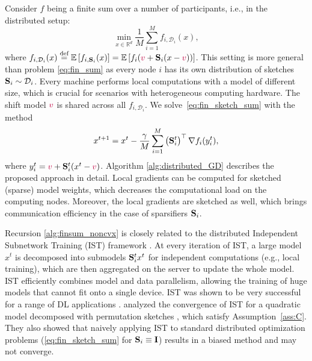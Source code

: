 \documentclass{article}
\newcommand{\shift}{{\color{purple}s}}
\newcommand{\bb}{\mathbb}
\newcommand{\R}{\bb R}
\newcommand{\cD}{\mathcal{D}}
\newcommand{\mI}{\mathbf{I}}
\newcommand{\eqdef}{\stackrel{\text{def}}{=}}
\newcommand{\Exp}[1]{{\bb E}\left[#1\right]}
\theoremstyle{plain}
\renewcommand{\shift}{{\color{purple}v}}
\newcommand{\mS}{{\bf S}}
\theoremstyle{plain}
\theoremstyle{definition}
\theoremstyle{remark}
\begin{document}
Consider $f$ being a finite sum over a number of participants, i.e., in the distributed setup:
\begin{equation} \label{eq:fin_sketch_sum}
	\min\limits_{x\in \R^d} \frac{1}{M}\sum\limits_{i=1}^M f_{i, \cD_i} (x),
\end{equation}
where $f_{i, \cD_i} (x) \eqdef \Exp{f_{i, \mS_i}(x)} = \Exp{f_i(\shift + \mS_i (x-\shift))}$.
This setting is more general than problem \eqref{eq:fin_sum} as every node $i$ has its own distribution of sketches $\mS_i \sim \cD_i$. Every machine performs local computations with a model of different size, which is crucial for scenarios with heterogeneous computing hardware.
The shift model $\shift$ is shared across all $f_{i, \mathcal{D}_i}$. We solve~\eqref{eq:fin_sketch_sum} with the method
\begin{equation} \label{alg:finsum_noncvx}
	x^{t+1} = x^t - \frac{\gamma}{M} \sum_{i=1}^{M}\left(\mS_i^t\right)^{\top} \nabla f_i(y^t_i),
\end{equation}
where $y^t_i = \shift + \mS_i^t (x^t - \shift)$.
Algorithm \ref{alg:distributed_GD} describes the proposed approach in detail. Local gradients can be computed for sketched (sparse) model weights, which decreases the computational load on the computing nodes. Moreover, the local gradients are sketched as well, which brings communication efficiency in the case of sparsifiers $\mS_i$.

Recursion \eqref{alg:finsum_noncvx} is closely related to the distributed Independent Subnetwork Training (IST) framework \citep{yuan2022distributed}. At every iteration of IST, a large model $x^t$ is decomposed into submodels $\mS^t_i x^t$ for independent computations (e.g., local training), which are then aggregated on the server to update the whole model.
IST efficiently combines model and data parallelism, allowing the training of huge models that cannot fit onto a single device. IST was shown to be very successful for a range of DL applications \citep{dun2022resist, wolfe2021gist}. \citet{shulgin2023towards} analyzed the convergence of IST for a quadratic model decomposed with permutation sketches \citep{szlendak2022permutation}, which satisfy Assumption~\ref{ass:C}. They also showed that naively applying IST to standard distributed optimization problems (\eqref{eq:fin_sketch_sum} for $\mS_i \equiv \mI$) results in a biased method and may not converge.
\end{document}
